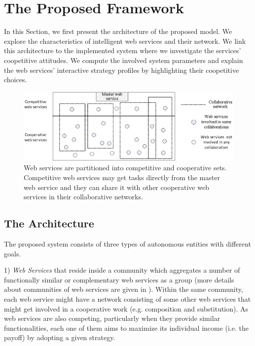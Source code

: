 \documentclass[fleqn]{singlecol-new}
\begin{document}
\section{The Proposed Framework}\label{The Proposed Framework}
In this Section, we first present the architecture of the proposed
model. We explore the characteristics of intelligent web services
and their network. We link this architecture to the implemented
system where we investigate the services' coopetitive attitudes.
We compute the involved system parameters and explain the web
services' interactive strategy profiles by highlighting their
coopetitive choices.

\begin{figure}[h]
\centering
\includegraphics[scale=1]{architecture++.eps}
\caption{Web services are partitioned into competitive and
cooperative sets. Competitive web services may get tasks directly
from the master web service and they can share it with other
cooperative web services in their collaborative networks.}
\label{architectureFigure}
\end{figure}

\subsection{The Architecture}

The proposed system consists of three types of autonomous entities
with different goals.

1) \textit{Web Services} that reside inside a community which
aggregates a number of functionally similar or complementary web
services as a group (more details about communities of web
services are given in \cite{Khosravifar2010}). Within the same
community, each web service might have a network consisting of
some other web services that might get involved in a cooperative
work (e.g. composition and substitution). As web services are also
competing, particularly when they provide similar functionalities,
each one of them aims to maximize its individual income (i.e. the
payoff) by adopting a given strategy.
\end{document}

